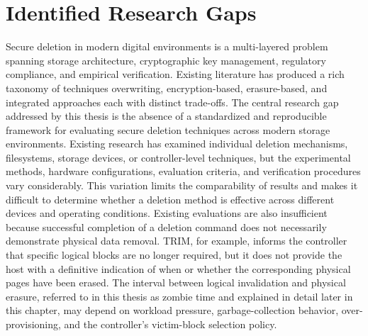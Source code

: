 \section{Identified Research Gaps}

Secure deletion in modern digital environments is a multi-layered problem spanning storage 
architecture, cryptographic key management, regulatory compliance, and empirical verification. 
Existing literature has produced a rich taxonomy of techniques overwriting, encryption-based, 
erasure-based, and integrated approaches each with distinct trade-offs. The central research gap 
addressed by this thesis is the absence of a standardized and reproducible framework for 
evaluating secure deletion techniques across modern storage environments. Existing research has 
examined individual deletion mechanisms, filesystems, storage devices, or controller-level 
techniques, but the experimental methods, hardware configurations, evaluation criteria, and 
verification procedures vary considerably. This variation limits the comparability of results and 
makes it difficult to determine whether a deletion method is effective across different devices 
and operating conditions. Existing evaluations are also insufficient because successful 
completion of a deletion command does not necessarily demonstrate physical data removal. TRIM, 
for example, informs the controller that specific logical blocks are no longer required, but it 
does not provide the host with a definitive indication of when or whether the corresponding 
physical pages have been erased. The interval between logical invalidation and physical erasure, 
referred to in this thesis as zombie time and explained in detail later in this chapter, may depend on 
workload pressure, garbage-collection behavior, over-provisioning, and the controller's 
victim-block selection policy. 

